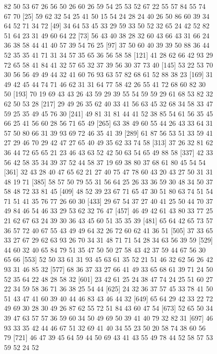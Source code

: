 \documentclass{article}
\begin{document}
\newpage
\begin{figure}[H]
\centering
\begin{Schunk}
\begin{Soutput}
    [1] 82 50 53 67 26 56 50 26 60 26 59 54 25 53 52 67 22 55 57 84 55 74 67 70
   [25] 59 62 32 54 25 41 50 15 54 24 28 24 40 26 50 86 60 39 34 64 52 71 34 72
   [49] 34 64 53 45 33 29 59 33 50 52 32 65 24 42 52 82 51 64 23 31 49 60 64 22
   [73] 56 43 40 38 28 32 60 43 66 43 31 66 24 36 38 58 44 41 40 57 39 54 76 25
   [97] 37 50 60 40 39 39 50 88 36 44 52 35 35 41 71 31 34 57 35 65 36 56 58 58
  [121] 41 28 62 66 42 93 29 72 65 58 41 84 41 32 57 65 32 37 39 56 30 37 73 40
  [145] 53 22 53 70 30 56 56 49 49 44 32 41 60 76 93 63 57 82 68 61 52 88 38 23
  [169] 31 49 42 45 44 74 71 46 62 31 31 64 77 58 42 26 55 41 72 68 60 82 30 50
  [193] 70 19 69 43 43 26 43 59 29 39 55 54 59 59 29 61 68 53 82 32 62 50 53 28
  [217] 29 49 26 35 62 40 33 41 56 63 45 32 68 34 58 33 47 59 25 35 49 45 76 30
  [241] 49 81 31 81 44 41 52 38 85 54 61 56 35 45 66 25 41 56 60 28 56 71 65 49
  [265] 63 38 49 60 55 44 26 43 33 64 31 57 50 80 66 31 39 93 69 72 46 35 41 39
  [289] 61 87 56 53 51 33 59 41 27 29 46 70 29 42 47 27 65 40 49 35 62 33 74 58
  [313] 37 26 32 81 62 36 44 72 65 65 21 23 46 43 63 52 42 50 63 54 65 49 88 58
  [337] 42 33 56 42 58 35 34 39 37 52 44 58 37 19 69 38 80 37 68 61 80 45 54 54
  [361] 32 43 28 40 47 65 62 21 27 40 75 47 78 60 43 20 43 27 50 31 31 48 19 71
  [385] 58 57 50 79 55 31 56 64 25 26 33 36 59 30 48 34 50 37 58 48 72 33 81 45
  [409] 48 52 39 23 67 71 65 47 30 51 80 63 74 51 54 71 51 41 35 76 77 26 60 30
  [433] 29 67 54 37 27 40 41 25 50 44 70 37 49 84 46 54 46 33 29 53 62 32 76 47
  [457] 46 49 42 61 43 80 33 77 25 21 62 67 63 24 39 30 36 43 45 60 51 35 35 39
  [481] 65 64 42 65 73 57 36 57 72 40 67 55 43 49 49 64 32 26 72 60 62 41 36 51
  [505] 37 33 65 33 27 67 29 62 63 93 26 70 34 31 48 71 71 54 28 34 63 56 39 59
  [529] 44 60 32 40 65 84 79 51 35 47 50 50 27 58 43 42 37 59 44 67 56 30 65 66
  [553] 52 50 33 61 31 93 45 63 61 35 52 21 51 46 32 62 56 26 42 93 31 46 85 32
  [577] 68 36 37 33 27 66 41 49 33 65 68 61 39 71 24 50 52 35 64 22 48 28 58 32
  [601] 23 42 61 25 24 38 47 74 24 25 51 60 27 22 34 59 58 36 71 36 38 25 54 44
  [625] 24 32 36 37 57 45 33 78 41 50 51 43 47 41 60 39 40 44 46 83 43 46 44 32
  [649] 65 64 29 42 33 22 72 49 69 30 28 30 49 26 87 62 55 72 51 84 43 60 47 54
  [673] 52 65 50 34 39 47 63 57 57 36 59 60 34 50 49 69 50 39 41 40 79 32 82 31
  [697] 46 93 33 35 42 44 46 67 51 32 69 41 40 34 55 23 50 20 58 74 38 60 56 79
  [721] 46 47 39 45 64 59 44 50 69 43 41 43 55 49 78 44 52 58 57 53 59 52 24 52

\end{Soutput}
\end{Schunk}
\end{figure}
\end{document}
